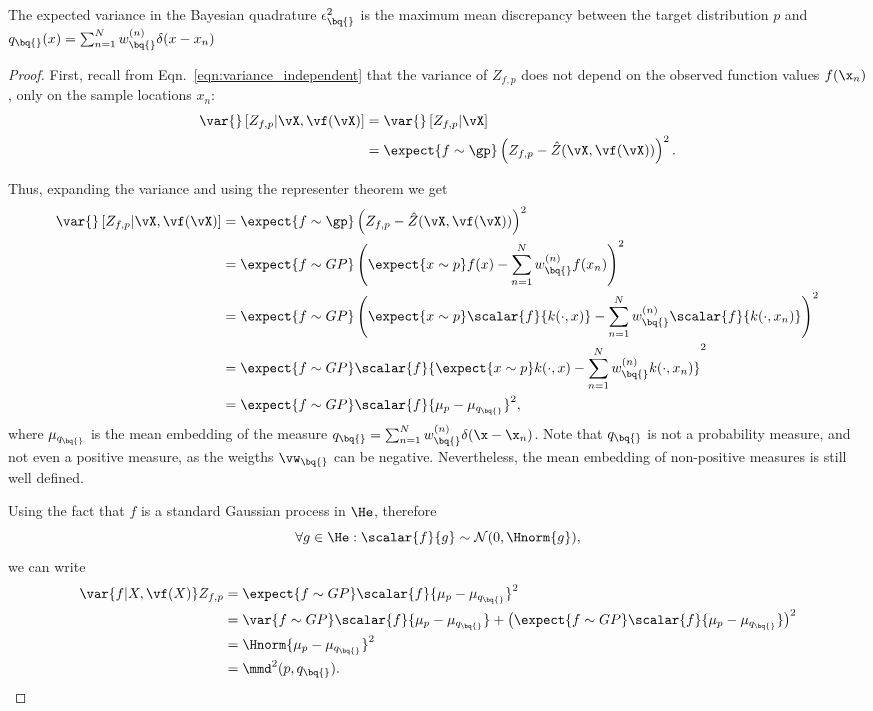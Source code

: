 \begin{proposition}
The expected variance in the Bayesian quadrature $\epsilon^{2}_{\bq{}}$  is the maximum mean discrepancy between the target distribution $p$ and $q_{\bq{}}(x) = \sum_{n=1}^{N}w^{(n)}_{\bq{}}\delta(x - x_n)$
%
\begin{proof}
First, recall from Eqn.\ \ref{eqn:variance_independent} that the variance of $Z_{f,p}$ does not depend on the observed function values $f(\x_n)$, only on the sample locations $x_n$:
%
\begin{align}
\var{} \left[ Z_{f,p} \vert \vX, \vf(\vX) \right] &= \var{} \left[ Z_{f,p} \vert \vX \right]\\
	&= \expect{f\sim\gp} \left(  Z_{f,p} - \hat{Z}(\vX,\vf(\vX)) \right)^2.
\end{align}

Thus, expanding the variance and using the representer theorem we get
%
\begin{align}
	\var{} \left[ Z_{f,p} \vert \vX, \vf(\vX) \right] 
	&= \expect{f\sim\gp} \left( Z_{f,p} - \hat{Z}(\vX,\vf(\vX)) \right)^2\\
	&= \expect{f\sim GP} \left( \expect{x\sim p} f(x) - \sum_{n=1}^{N}w^{(n)}_{\bq{}} f(x_n)\right)^2\\	
	&= \expect{f\sim GP} \left( \expect{x\sim p} \scalar{f}{k(\cdot,x)} - \sum_{n=1}^{N}w^{(n)}_{\bq{}} \scalar{f}{k(\cdot,x_n)}\right)^2\\
	&= \expect{f\sim GP} \scalar{f}{\expect{x\sim p} k(\cdot,x) - \sum_{n=1}^{N}w^{(n)}_{\bq{}}k(\cdot,x_n)}^2\\
	&= \expect{f\sim GP} \scalar{f}{\mu_p - \mu_{q_{\bq{}}}}^2,
\end{align}
%
where $\mu_{q_{\bq{}}}$ is the mean embedding of the measure $q_{\bq{}} = \sum_{n=1}^{N} w^{(n)}_{\bq{}} \delta(\x - \x_n)$. Note that $q_{\bq{}}$ is not a probability measure, and not even a positive measure, as the weigths $\vw_{\bq{}}$ can be negative. Nevertheless, the mean embedding of non-positive measures is still well defined.

Using the fact that $f$ is a standard Gaussian process in $\He$, therefore
%
\begin{equation}
	\forall g\in\He: \scalar{f}{g} \sim \mathcal{N}(0,\Hnorm{g}),
\end{equation}
%
we can write
%
\begin{align}
	\var{f\vert X,\vf(X)} Z_{f,p} &= \expect{f\sim GP} \scalar{f}{\mu_p - \mu_{q_{\bq{}}}}^2\\
	&= \var{f\sim GP} \scalar{f}{\mu_p - \mu_{q_{\bq{}}}} + \left(\expect{f\sim GP} \scalar{f}{\mu_p - \mu_{q_{\bq{}}}} \right)^2\\
	&= \Hnorm{\mu_p - \mu_{q_{\bq{}}}}^2\\
	&= \mmd^2(p,q_{\bq{}}).
\end{align}
\end{proof}
\end{proposition}


